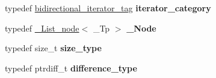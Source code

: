 \begin{DoxyCompactItemize}
typedef \hyperlink{structbidirectional__iterator__tag}{bidirectional\+\_\+iterator\+\_\+tag} {\bfseries iterator\+\_\+category}
\item 
\mbox{\label{struct___list__iterator_a021420f3c0ad630e27d5e3b2218a1700}} 
typedef \hyperlink{class___list__node}{\+\_\+\+List\+\_\+node}$<$ \+\_\+\+Tp $>$ {\bfseries \+\_\+\+Node}
\item 
\mbox{\label{struct___list__iterator_a453fb8a326a56824c8dd691df5fb038f}} 
typedef size\+\_\+t {\bfseries size\+\_\+type}
\item 
\mbox{\label{struct___list__iterator_ae9854f976ce1fd3a2ce45d3fd4fa3f45}} 
typedef ptrdiff\+\_\+t {\bfseries difference\+\_\+type}
\end{DoxyCompactItemize}
